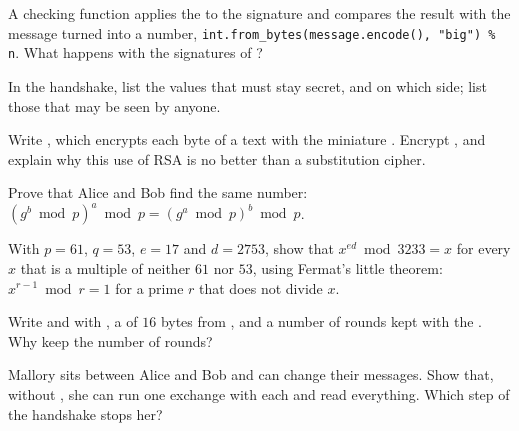 \begin{exercise}[$\star\star$]\label{exo:g12:secure-communication:9}
A checking function applies the  to the signature and compares the result with the message turned into a
number, \texttt{int.from\_bytes(message.encode(), "big") \% n}. What happens with the signatures of ?
\end{exercise}

\begin{exercise}[$\star\star$]\label{exo:g12:secure-communication:10}
In the handshake, list the values that must stay secret, and on which side; list those that may be seen by anyone.
\end{exercise}

\begin{exercise}[$\star\star$]\label{exo:g12:secure-communication:11}
Write , which encrypts each byte of a text with the miniature . Encrypt
, and explain why this use of RSA is no better than a substitution cipher.
\end{exercise}

\begin{exercise}[$\star\star\star$]\label{exo:g12:secure-communication:12}
Prove that Alice and Bob find the same number: $(g^b \bmod p)^a \bmod p = (g^a \bmod p)^b \bmod p$.
\end{exercise}

\begin{exercise}[$\star\star\star$]\label{exo:g12:secure-communication:13}
With $p = 61$, $q = 53$, $e = 17$ and $d = 2753$, show that $x^{ed} \bmod 3233 = x$ for every $x$ that is a multiple
of neither $61$ nor $53$, using Fermat's little theorem: $x^{r - 1} \bmod r = 1$ for a prime $r$ that does not divide
$x$.
\end{exercise}

\begin{exercise}[$\star\star\star$]\label{exo:g12:secure-communication:14}
Write  and  with , a  of $16$ bytes from
, and a number of rounds kept with the . Why keep the number of rounds?
\end{exercise}

\begin{exercise}[$\star\star\star$]\label{exo:g12:secure-communication:15}
Mallory sits between Alice and Bob and can change their messages. Show that, without , she can run one
exchange with each and read everything. Which step of the handshake stops her?
\end{exercise}

